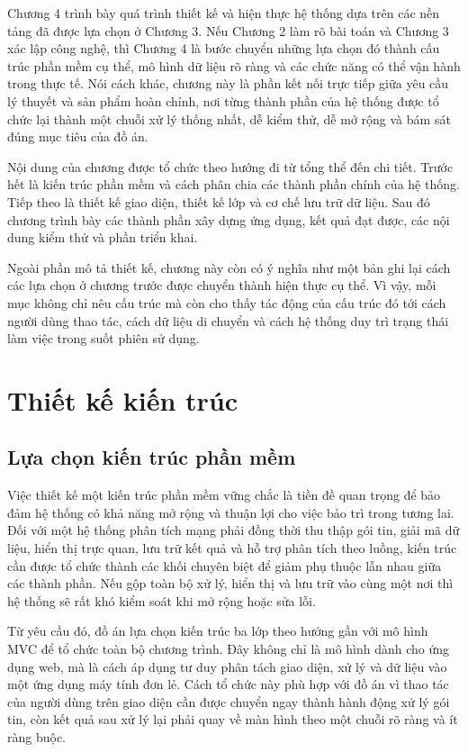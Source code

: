 \documentclass[../DoAn.tex]{subfiles}
\begin{document}
Chương 4 trình bày quá trình thiết kế và hiện thực hệ thống dựa trên các nền tảng đã được lựa chọn ở Chương 3. Nếu Chương 2 làm rõ bài toán và Chương 3 xác lập công nghệ, thì Chương 4 là bước chuyển những lựa chọn đó thành cấu trúc phần mềm cụ thể, mô hình dữ liệu rõ ràng và các chức năng có thể vận hành trong thực tế. Nói cách khác, chương này là phần kết nối trực tiếp giữa yêu cầu lý thuyết và sản phẩm hoàn chỉnh, nơi từng thành phần của hệ thống được tổ chức lại thành một chuỗi xử lý thống nhất, dễ kiểm thử, dễ mở rộng và bám sát đúng mục tiêu của đồ án.

Nội dung của chương được tổ chức theo hướng đi từ tổng thể đến chi tiết. Trước hết là kiến trúc phần mềm và cách phân chia các thành phần chính của hệ thống. Tiếp theo là thiết kế giao diện, thiết kế lớp và cơ chế lưu trữ dữ liệu. Sau đó chương trình bày các thành phần xây dựng ứng dụng, kết quả đạt được, các nội dung kiểm thử và phần triển khai.

Ngoài phần mô tả thiết kế, chương này còn có ý nghĩa như một bản ghi lại cách các lựa chọn ở chương trước được chuyển thành hiện thực cụ thể. Vì vậy, mỗi mục không chỉ nêu cấu trúc mà còn cho thấy tác động của cấu trúc đó tới cách người dùng thao tác, cách dữ liệu di chuyển và cách hệ thống duy trì trạng thái làm việc trong suốt phiên sử dụng.
\section{Thiết kế kiến trúc}
\subsection{Lựa chọn kiến trúc phần mềm}
Việc thiết kế một kiến trúc phần mềm vững chắc là tiền đề quan trọng để bảo đảm hệ thống có khả năng mở rộng và thuận lợi cho việc bảo trì trong tương lai. Đối với một hệ thống phân tích mạng phải đồng thời thu thập gói tin, giải mã dữ liệu, hiển thị trực quan, lưu trữ kết quả và hỗ trợ phân tích theo luồng, kiến trúc cần được tổ chức thành các khối chuyên biệt để giảm phụ thuộc lẫn nhau giữa các thành phần. Nếu gộp toàn bộ xử lý, hiển thị và lưu trữ vào cùng một nơi thì hệ thống sẽ rất khó kiểm soát khi mở rộng hoặc sửa lỗi.

Từ yêu cầu đó, đồ án lựa chọn kiến trúc ba lớp theo hướng gần với mô hình MVC để tổ chức toàn bộ chương trình. Đây không chỉ là mô hình dành cho ứng dụng web, mà là cách áp dụng tư duy phân tách giao diện, xử lý và dữ liệu vào một ứng dụng máy tính đơn lẻ. Cách tổ chức này phù hợp với đồ án vì thao tác của người dùng trên giao diện cần được chuyển ngay thành hành động xử lý gói tin, còn kết quả sau xử lý lại phải quay về màn hình theo một chuỗi rõ ràng và ít ràng buộc.
\end{document}
